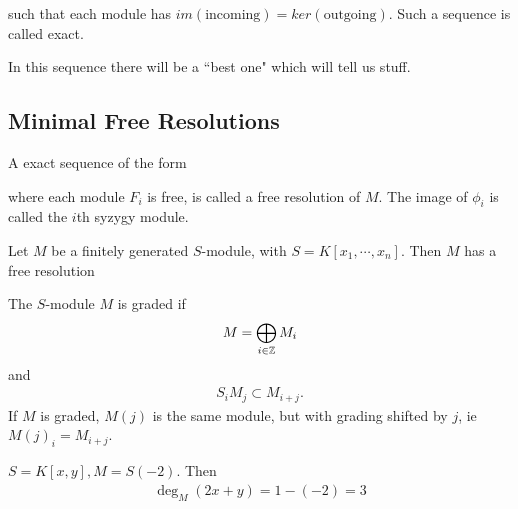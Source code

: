 such that each module has $im(\text{incoming}) = ker(\text{outgoing})$. Such a sequence is called exact.

In this sequence there will be a ``best one" which will tell us stuff.

\subsection{Minimal Free Resolutions}

\begin{definition}
    A exact sequence of the form
    \begin{center}
    \end{center}
    where each module $F_i$ is free, is called a free resolution of $M$. The image of $\phi_i$ is called the $i$th syzygy module.
\end{definition}

\begin{theorem}
    Let $M$ be a finitely generated $S$-module, with $S = K [x_1, \cdots , x_n]$. Then $M$ has a free resolution
    \begin{center}
    \end{center}
\end{theorem}

\begin{definition}
    The $S$-module $M$ is graded if
    \begin{align*}
        M = \bigoplus_{i \in \mathbb{Z}} M_i
    \end{align*}
    and 
    \begin{align*}
        S_ i M_j \subset M_{i+j}.
    \end{align*}
    If $M$ is graded, $M(j) $ is the same module, but with grading shifted by $j$, ie $M(j)_i = M_{i+j}$.
\end{definition}

\begin{example}
    $S = K[x,y], M= S(-2)$. Then
    \begin{align*}
        \deg_M (2x + y) = 1 - (-2) = 3
    \end{align*}
\end{example}

